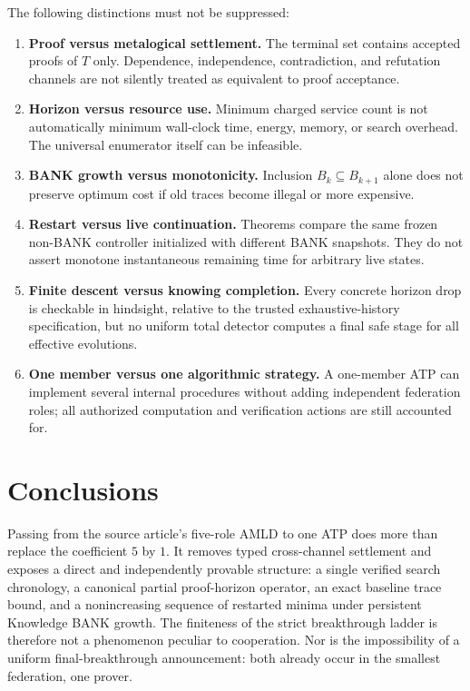\documentclass[11pt]{article}
\theoremstyle{definition}
\begin{document}
The following distinctions must not be suppressed:
\begin{enumerate}[label=(\arabic*)]
\item \textbf{Proof versus metalogical settlement.} The terminal set contains accepted proofs of $T$ only. Dependence, independence, contradiction, and refutation channels are not silently treated as equivalent to proof acceptance.
\item \textbf{Horizon versus resource use.} Minimum charged service count is not automatically minimum wall-clock time, energy, memory, or search overhead. The universal enumerator itself can be infeasible.
\item \textbf{BANK growth versus monotonicity.} Inclusion $B_k\subseteq B_{k+1}$ alone does not preserve optimum cost if old traces become illegal or more expensive.
\item \textbf{Restart versus live continuation.} Theorems compare the same frozen non-BANK controller initialized with different BANK snapshots. They do not assert monotone instantaneous remaining time for arbitrary live states.
\item \textbf{Finite descent versus knowing completion.} Every concrete horizon drop is checkable in hindsight, relative to the trusted exhaustive-history specification, but no uniform total detector computes a final safe stage for all effective evolutions.
\item \textbf{One member versus one algorithmic strategy.} A one-member ATP can implement several internal procedures without adding independent federation roles; all authorized computation and verification actions are still accounted for.
\end{enumerate}

\section{Conclusions}
Passing from the source article's five-role AMLD to one ATP does more than replace the coefficient $5$ by $1$. It removes typed cross-channel settlement and exposes a direct and independently provable structure: a single verified search chronology, a canonical partial proof-horizon operator, an exact baseline trace bound, and a nonincreasing sequence of restarted minima under persistent Knowledge BANK growth. The finiteness of the strict breakthrough ladder is therefore not a phenomenon peculiar to cooperation. Nor is the impossibility of a uniform final-breakthrough announcement: both already occur in the smallest federation, one prover.
\end{document}
